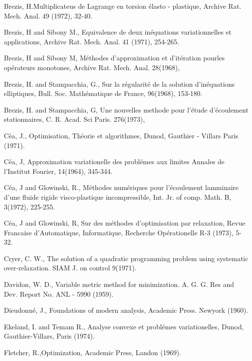 \begin{thebibliography}{99}
 {Brezis, H}.\pageoriginale Multiplicateus de Lagrange
  en torsion \'{e}lasto - plastique, Archive Rat. Mech. Anal. 49
  (1972), 32-40. 

 {Brezis, H and Sibony M}., Equivalence de deux
  in\'{e}quations variationnelles et applications, Archive
  Rat. Mech. Anal. 41 (1971), 254-265. 

 {Brezis, H and Sibony M}, M\'{e}thodes d'approximation
  et d'it\'{e}ration pourles op\'{e}rateurs monotones, Archive
  Rat. Mech. Anal. 28(1968), 

 {Brezis, H. and Stampacchia, G}., Sur la
  r\'{e}gularit\'{e} de la solution d'in\'{e}quations elliptiques,
  Bull. Soc. Math\'{e}matique de France, 96(1968), 153-180.

 {Brezis, H. and Stampacchia, G}, Une nouvelles methode
  pour l'\'{e}tude d'\'{e}coulement stationnaires, C. R. Acad. Sci
  Paris. 276(1973),

 {C\'{e}a, J}., Optimisation, Th\'{e}orie et
  algorithmes, Dunod, Gauthier - Villars Paris (1971).

 {C\'{e}a, J}, Approximation variationelle des
  probl\'{e}mes aux limites Annales de l'Institut Fourier, 14(1964),
  345-344.

 {C\'{e}a, J and Glowinski, R}., M\'{e}thodes
  num\'{e}riques pour l'\'{e}coulement lamminaire d'une fluide rigide
  visco-plastique incompressible, Int. Jr. of comp. Math. B, 3(1972),
  225-255.

 {C\'{e}a, J and Glowinski, R}, Sur des m\'{e}thodes
  d'optimisation par relaxation, Revue Francaise d'Automatique,
  Informatique, Recherche Op\'{e}rationelle R-3 (1973), 5-32.

 {Cryer, C. W.}, The solution of a quadratic
  programming problem using systematic over-relaxation. SIAM J. on
  control 9(1971). 

 {Davidon, W. D.}, Variable metric method for
  minimization. A. G. G. Res and Dev. Report No. ANL - 5990 (1959).

 {Dieudonn\'{e}, J}., Foundations of modern analysis,
  Academic Press. Newyork (1960).

 {Ekeland, I. and Temam R}., Analyse convexe et
  probl\'{e}mes variationelles, Dunod, Gauthier-Villars, Paris
  (1974).

 {Fletcher, R}.,\pageoriginale Optimization, Academic
  Press, Landon (1969).


\end{thebibliography}
